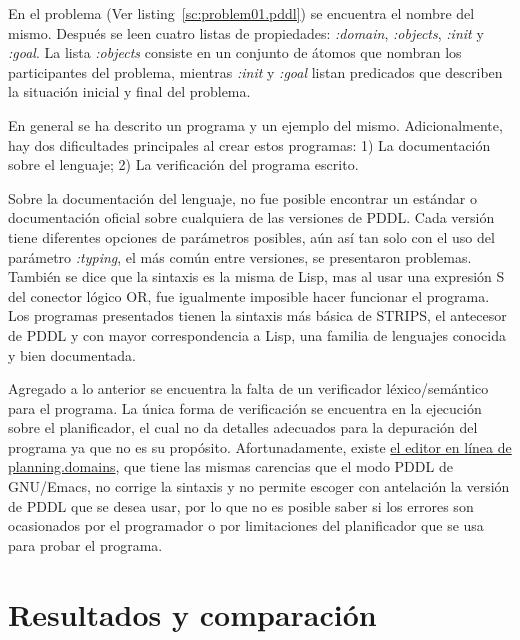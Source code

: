 \documentclass[a4paper,12pt]{article}
\begin{document}


En el problema (Ver listing~\ref{sc:problem01.pddl}) se encuentra el nombre del mismo. Después se leen cuatro listas de propiedades: \emph{:domain}, \emph{:objects}, \emph{:init} y \emph{:goal}. La lista \emph{:objects} consiste en un conjunto de átomos que nombran los participantes del problema, mientras \emph{:init} y \emph{:goal} listan predicados que describen la situación inicial y final del problema.



En general se ha descrito un programa y un ejemplo del mismo. Adicionalmente, hay dos dificultades principales al crear estos programas: 1) La documentación sobre el lenguaje; 2) La verificación del programa escrito.

Sobre la documentación del lenguaje, no fue posible encontrar un estándar o documentación oficial sobre cualquiera de las versiones de PDDL. Cada versión tiene diferentes opciones de parámetros posibles, aún así tan solo con el uso del parámetro \emph{:typing}, el más común entre versiones, se presentaron problemas. También se dice que la sintaxis es la misma de Lisp, mas al usar una expresión S del conector lógico OR, fue igualmente imposible hacer funcionar el programa. Los programas presentados tienen la sintaxis más básica de STRIPS, el antecesor de PDDL y con mayor correspondencia a Lisp, una familia de lenguajes conocida y bien documentada.

Agregado a lo anterior se encuentra la falta de un verificador léxico/semántico para el programa. La única forma de verificación se encuentra en la ejecución sobre el planificador, el cual no da detalles adecuados para la depuración del programa ya que no es su propósito.  Afortunadamente, existe \href{http://editor.planning.domains/}{el editor en línea de planning.domains}, que tiene las mismas carencias que el modo PDDL de GNU/Emacs, no corrige la sintaxis y no permite escoger con antelación la versión de PDDL que se desea usar, por lo que no es posible saber si los errores son ocasionados por el programador o por limitaciones del planificador que se usa para probar el programa.

\section{Resultados y comparación}
\end{document}

